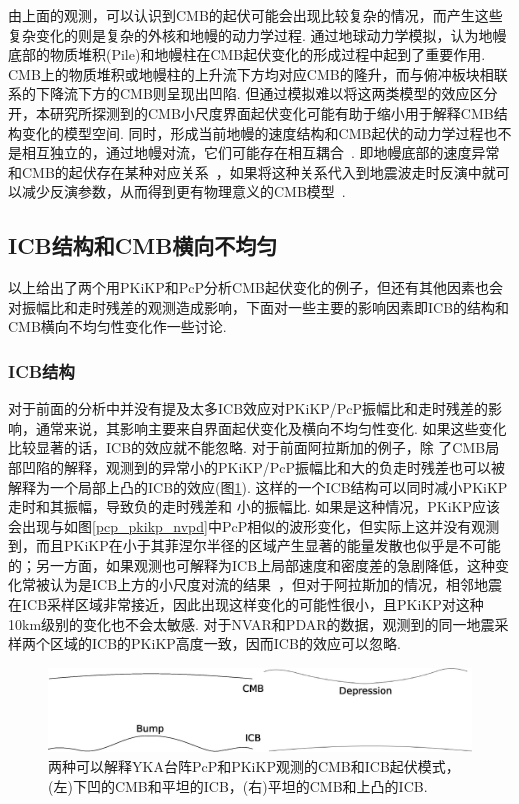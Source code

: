 由上面的观测，可以认识到CMB的起伏可能会出现比较复杂的情况，而产生这些复杂变化的则是复杂的外核和地幔的动力学过程. \citet{Lassak2010a}通过地球动力学模拟，认为地幔底部的物质堆积(Pile)和地幔柱在CMB起伏变化的形成过程中起到了重要作用. CMB上的物质堆积或地幔柱的上升流下方均对应CMB的隆升，而与俯冲板块相联系的下降流下方的CMB则呈现出凹陷. 但通过模拟难以将这两类模型的效应区分开，本研究所探测到的CMB小尺度界面起伏变化可能有助于缩小用于解释CMB结构变化的模型空间. 同时，形成当前地幔的速度结构和CMB起伏的动力学过程也不是相互独立的，通过地幔对流，它们可能存在相互耦合~\citep{Forte1991a}. 即地幔底部的速度异常和CMB的起伏存在某种对应关系~\citep{Forte1994a}，如果将这种关系代入到地震波走时反演中就可以减少反演参数，从而得到更有物理意义的CMB模型~\citep{Soldati2012a}.

\subsection{ICB结构和CMB横向不均匀}

以上给出了两个用PKiKP和PcP分析CMB起伏变化的例子，但还有其他因素也会对振幅比和走时残差的观测造成影响，下面对一些主要的影响因素即ICB的结构和CMB横向不均匀性变化作一些讨论. 

\subsubsection{ICB结构}

对于前面的分析中并没有提及太多ICB效应对PKiKP/PcP振幅比和走时残差的影响，通常来说，其影响主要来自界面起伏变化及横向不均匀性变化. 如果这些变化比较显著的话，ICB的效应就不能忽略. 对于前面阿拉斯加的例子，除
了CMB局部凹陷的解释，观测到的异常小的PKiKP/PcP振幅比和大的负走时残差也可以被解释为一个局部上凸的ICB的效应(图\ref{fig:model}). 这样的一个ICB结构可以同时减小PKiKP走时和其振幅，导致负的走时残差和
小的振幅比. 如果是这种情况，PKiKP应该会出现与如图\ref{pcp_pkikp_nvpd}中PcP相似的波形变化，但实际上这并没有观测到，而且PKiKP在小于其菲涅尔半径的区域产生显著的能量发散也似乎是不可能的；另一方面，如果观测也可解释为ICB上局部速度和密度差的急剧降低，这种变化常被认为是ICB上方的小尺度对流的结果~\citep{Krasnoshchekov2005}，但对于阿拉斯加的情况，相邻地震在ICB采样区域非常接近，因此出现这样变化的可能性很小，且PKiKP对这种10km级别的变化也不会太敏感. 对于NVAR和PDAR的数据，观测到的同一地震采样两个区域的ICB的PKiKP高度一致，因而ICB的效应可以忽略. 

\begin{figure}[!ht]
\centering
\includegraphics[width=0.7\linewidth]{fig/chap3/model}
\caption{两种可以解释YKA台阵PcP和PKiKP观测的CMB和ICB起伏模式，(左)下凹的CMB和平坦的ICB，(右)平坦的CMB和上凸的ICB. }
\label{fig:model}
\end{figure}

